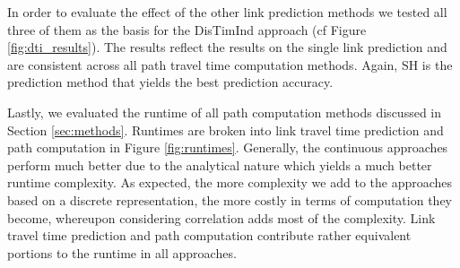 In order to evaluate the effect of the other link prediction methods we tested
all three of them as the basis for the DisTimInd approach (cf Figure
\ref{fig:dti_results}). The results reflect the results on the single link
prediction and are consistent across all path travel time computation methods.
Again, SH is the prediction method that yields the best prediction accuracy.

Lastly, we evaluated the runtime of all path computation methods discussed in
Section \ref{sec:methods}. Runtimes are broken into link travel time
prediction and path computation in Figure \ref{fig:runtimes}. Generally, the
continuous approaches perform much better due to the analytical nature which
yields a much better runtime complexity. As expected, the more complexity we add
to the approaches based on a discrete representation, the more costly in terms
of computation they become, whereupon considering correlation adds most of the
complexity. Link travel time prediction and path computation contribute rather
equivalent portions to the runtime in all approaches.


